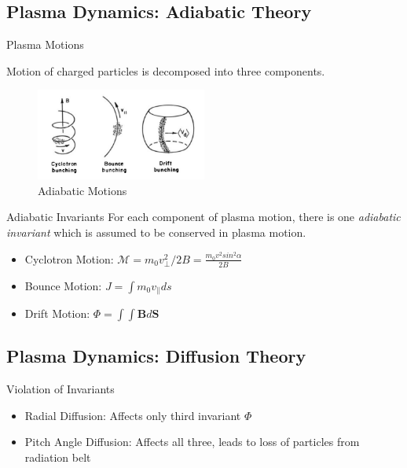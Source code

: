 \documentclass{beamer}
\begin{document}
\subsection{Plasma Dynamics:  Adiabatic Theory}

\begin{frame}{Plasma Motions}

  Motion of charged particles is decomposed into three components.
  
   \begin{figure}[h]
        \includegraphics[width=0.5\textwidth]{adiabatic_motions}
        \caption{Adiabatic Motions}
        \label{fig:Adiabatic}
      \end{figure}
\end{frame}

\begin{frame}{Adiabatic Invariants}
  For each component of plasma motion, there is one \emph{adiabatic
    invariant} which is assumed to be conserved in plasma motion.

  \begin{itemize}
  \item<1->{
      Cyclotron Motion: $\mathcal{M} = m_{0} v^{2}_{\perp}/2B =
      \frac{m_{0}v^2 sin^{2}\alpha}{2B}$
    }
  \item<2->{
      Bounce Motion: $J = \int{m_0 v_{\parallel}ds}$
    }
  \item<3->{
      Drift Motion: $\Phi = \int{\int{\mathbf{B} d\mathbf{S}}}$
    }
  \end{itemize}

\end{frame}

\subsection{Plasma Dynamics: Diffusion Theory}

\begin{frame}{Violation of Invariants}
  \begin{itemize}
  \item<1->{Radial Diffusion: Affects only third invariant $\Phi$}
  \item<2->{Pitch Angle Diffusion: Affects all three, leads to loss of
    particles from radiation belt}
  \end{itemize}
\end{frame}
\end{document}
